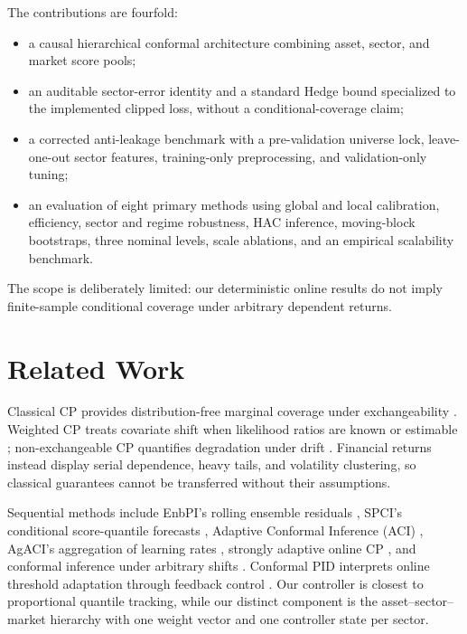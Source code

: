 \documentclass[conference]{IEEEtran}
\newcounter{algorithm}
\begin{document}
The contributions are fourfold:
\begin{itemize}
 \item a causal hierarchical conformal architecture combining asset, sector, and market score pools;
 \item an auditable sector-error identity and a standard Hedge bound specialized to the implemented clipped loss, without a conditional-coverage claim;
 \item a corrected anti-leakage benchmark with a pre-validation universe lock, leave-one-out sector features, training-only preprocessing, and validation-only tuning;
 \item an evaluation of eight primary methods using global and local calibration, efficiency, sector and regime robustness, HAC inference, moving-block bootstraps, three nominal levels, scale ablations, and an empirical scalability benchmark.
\end{itemize}
The scope is deliberately limited: our deterministic online results do not imply finite-sample conditional coverage under arbitrary dependent returns.

\section{Related Work}

Classical CP provides distribution-free marginal coverage under exchangeability \cite{vovk2005algorithmic,lei2018distribution}. Weighted CP treats covariate shift when likelihood ratios are known or estimable \cite{tibshirani2019covariate}; non-exchangeable CP quantifies degradation under drift \cite{barber2023beyond}. Financial returns instead display serial dependence, heavy tails, and volatility clustering, so classical guarantees cannot be transferred without their assumptions.

Sequential methods include EnbPI's rolling ensemble residuals \cite{xu2021enbpi}, SPCI's conditional score-quantile forecasts \cite{xu2023spci}, Adaptive Conformal Inference (ACI) \cite{gibbs2021adaptive}, AgACI's aggregation of learning rates \cite{zaffran2022adaptive}, strongly adaptive online CP \cite{bhatnagar2023saocp}, and conformal inference under arbitrary shifts \cite{gibbs2024arbitrary}. Conformal PID interprets online threshold adaptation through feedback control \cite{angelopoulos2023pid}. Our controller is closest to proportional quantile tracking, while our distinct component is the asset--sector--market hierarchy with one weight vector and one controller state per sector.
\end{document}
